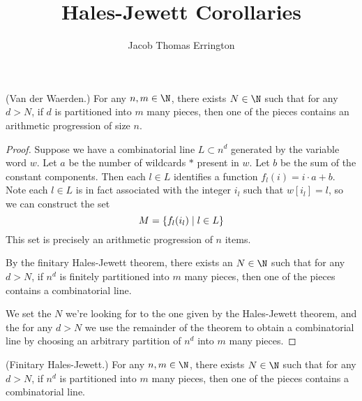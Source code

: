 \documentclass[11pt]{article}
\author{Jacob Thomas Errington}
\title{Hales-Jewett Corollaries}
\date{}
\begin{document}
\maketitle

\begin{prop}{(Van der Waerden.)}
    For any $n, m \in \N$, there exists $N \in \N$ such that for any $d > N$,
    if $d$ is partitioned into $m$ many pieces, then one of the pieces contains
    an arithmetic progression of size $n$.
\end{prop}

\begin{proof}
    Suppose we have a combinatorial line $L \subset n^d$ generated by the
    variable word $w$.
    Let $a$ be the number of wildcards $*$ present in $w$.
    Let $b$ be the sum of the constant components.
    Then each $l \in L$ identifies a function $f_l(i) = i \cdot a + b$.
    Note each $l \in L$ is in fact associated with the integer $i_l$ such that
    $w[i_l] = l$, so we can construct the set
    \begin{equation*}
        M = \left\{ f_l(i_l) \;\vert\; l \in L \right\}
    \end{equation*}
    This set is precisely an arithmetic progression of $n$ items.

    By the finitary Hales-Jewett theorem, there exists an $N \in \N$ such that
    for any $d > N$, if $n^d$ is finitely partitioned into $m$ many pieces,
    then one of the pieces contains a combinatorial line.

    We set the $N$ we're looking for to the one given by the Hales-Jewett
    theorem, and the for any $d > N$ we use the remainder of the theorem to
    obtain a combinatorial line by choosing an arbitrary partition of $n^d$
    into $m$ many pieces.
\end{proof}

\begin{prop}{(Finitary Hales-Jewett.)}
    For any $n, m \in \N$, there exists $N \in \N$ such that for any $d > N$,
    if $n^d$ is partitioned into $m$ many pieces, then one of the pieces
    contains a combinatorial line.
\end{prop}
\end{document}
